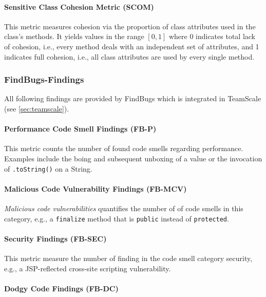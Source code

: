 \documentclass{scrartcl}
\begin{document}
\paragraph{Sensitive Class Cohesion Metric (SCOM)}

This metric measures cohesion via the proportion of class attributes used in the
class's methods. It yields values in the range $[0,1]$ where 0 indicates total
lack of cohesion, i.e., every method deals with an independent set of
attributes, and 1 indicates full cohesion, i.e., all class attributes are used
by every single method.

\subsubsection{FindBugs-Findings}

All following findings are provided by FindBugs which is integrated in TeamScale
(see \ref{sec:teamscale}).

\paragraph{Performance Code Smell Findings (FB-P)}

This metric counts the number of found code smells regarding performance.
Examples include the boing and subsequent unboxing of a value or the invocation
of \texttt{.toString()} on a String.

\paragraph{Malicious Code Vulnerability Findings (FB-MCV)}

\emph{Malicious code vulnerabilities} quantifies the number of of code smells in
this category, e.g., a \texttt{finalize} method that is \texttt{public} instead
of \texttt{protected}.

\paragraph{Security Findings (FB-SEC)}

This metric measure the number of finding in the code smell category security,
e.g., a JSP-reflected cross-site scripting vulnerability.

\paragraph{Dodgy Code Findings (FB-DC)}
\end{document}
